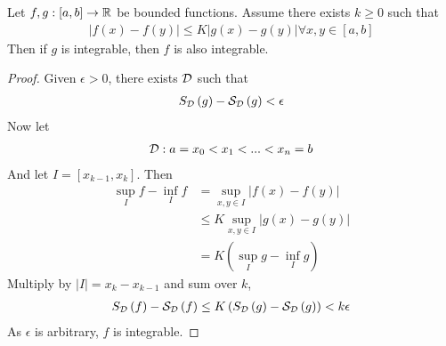 \documentclass[a4paper]{article}
\begin{document}
\begin{lemma}
Let $f,g:\left[a,b\right] \to \mathbb{R}$ be bounded functions. Assume there exists $k\geq 0$ such that
\begin{equation*}
\begin{aligned}
|f\left(x\right) - f\left(y\right)| \leq K|g\left(x\right) - g\left(y\right)| \forall x,y\in\left[a,b\right]
\end{aligned}
\end{equation*}
Then if $g$ is integrable, then $f$ is also integrable.
\begin{proof}
Given $\epsilon>0$, there exists $\mathcal{D}$ such that
\begin{equation*}
\begin{aligned}
S_{\mathcal{D}} \left(g\right) - \mathcal{S}_{\mathcal{D}}\left(g\right) < \epsilon
\end{aligned}
\end{equation*}
Now let 
\begin{equation*}
\begin{aligned}
\mathcal{D}: a=x_0 < x_1 < ... < x_n = b
\end{aligned}
\end{equation*}
And let $I=\left[x_{k-1},x_k\right]$. Then
\begin{equation*}
\begin{aligned}
\sup_I f - \inf_I f &= \sup_{x,y\in I} |f\left(x\right)-f\left(y\right)| \\
&\leq K\sup_{x,y\in I} |g\left(x\right)-g\left(y\right)|\\
&= K\left(\sup_I g - \inf_I g\right)
\end{aligned}
\end{equation*}
Multiply by $|I| = x_k - x_{k-1}$ and sum over $k$,
\begin{equation*}
\begin{aligned}
S_{\mathcal{D}} \left(f\right) - \mathcal{S}_{\mathcal{D}} \left(f\right) \leq K\left(S_{\mathcal{D}}\left(g\right) - \mathcal{S}_{\mathcal{D}} \left(g\right) \right) < k\epsilon
\end{aligned}
\end{equation*}
As $\epsilon$ is arbitrary, $f$ is integrable.
\end{proof}
\end{lemma}
\end{document}
